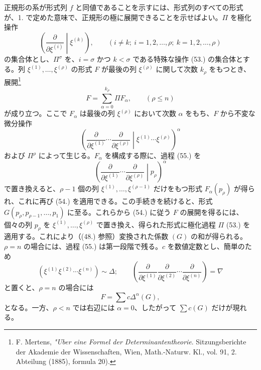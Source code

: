 \documentclass[11pt]{jlreq}
\begin{document}
正規形の系が形式列 $f$ と同値であることを示すには、形式列のすべての形式が、1. で定めた意味で、正規形の極に展開できることを示せばよい。$\Pi$ を極化操作
\begin{equation}
 \left(\frac{\partial}{\partial\xi^{(i)}}\middle|\xi^{(k)}\right),
 \qquad (i\ne k;\ i=1,2,\ldots,\rho;\ k=1,2,\ldots,\rho)
\tag{53}
\end{equation}
の集合体とし、$\Pi^\sigma$ を、$i=\sigma$ かつ $k<\sigma$ である特殊な操作 (53.) の集合体とする。列 $\xi^{(1)},\ldots,\xi^{(\rho)}$ の形式 $F$ が最後の列 $\xi^{(\rho)}$ に関して次数 $k_\rho$ をもつとき、展開\footnote{F. Mertens, \emph{"Uber eine Formel der Determinantentheorie}. Sitzungsberichte der Akademie der Wissenschaften, Wien, Math.-Naturw. Kl., vol. 91, 2. Abteilung (1885), formula 20).}
\begin{equation}
 F=\sum_{\alpha=0}^{k_\rho}\Pi F_\alpha,
 \qquad(\rho\le n)
\tag{54}
\end{equation}
が成り立つ。ここで $F_\alpha$ は最後の列 $\xi^{(\rho)}$ において次数 $\alpha$ をもち、$F$ から不変な微分操作
\begin{equation}
 \left(\frac{\partial}{\partial\xi^{(1)}}\cdots\frac{\partial}{\partial\xi^{(\rho)}}\middle|\xi^{(1)}\cdots\xi^{(\rho)}\right)^\alpha
\tag{55}
\end{equation}
および $\Pi^\rho$ によって生じる。$F_\alpha$ を構成する際に、過程 (55.) を
\begin{equation}
 \left(\frac{\partial}{\partial\xi^{(1)}}\cdots\frac{\partial}{\partial\xi^{(\rho)}}\middle|p_\rho\right)^\alpha
\tag{56}
\end{equation}
で置き換えると、$\rho-1$ 個の列 $\xi^{(1)},\ldots,\xi^{(\rho-1)}$ だけをもつ形式 $F_\alpha(p_\rho)$ が得られ、これに再び (54.) を適用できる。この手続きを続けると、形式 $G(p_\rho,p_{\rho-1},\ldots,p_1)$ に至る。これらから (54.) に従う $F$ の展開を得るには、個々の列 $p_\rho$ を $\xi^{(1)},\ldots,\xi^{(\rho)}$ で置き換え、得られた形式に極化過程 $\Pi$ (53.) を適用する。これにより（(48.) 参照）変換された係数 $(G)$ の和が得られる。$\rho=n$ の場合には、過程 (55.) は第一段階で残る。$c$ を数値定数とし、簡単のため
\begin{equation}
 (\xi^{(1)}\xi^{(2)}\cdots\xi^{(n)})\sim\Delta;
 \qquad
 \left(\frac{\partial}{\partial\xi^{(1)}}\frac{\partial}{\partial\xi^{(2)}}\cdots\frac{\partial}{\partial\xi^{(n)}}\right)=\nabla
\tag{57}
\end{equation}
と置くと、$\rho=n$ の場合には
\begin{equation}
 F=\sum c\Delta^\alpha(G),
\tag{58}
\end{equation}
となる。一方、$\rho<n$ では右辺には $\alpha=0$、したがって $\sum c(G)$ だけが現れる。
\end{document}
